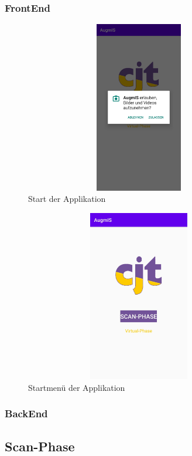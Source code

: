\subsubsection{FrontEnd}
\begin{figure}[hbt!]
    \centering
    \includegraphics[width=10cm,height=7.5cm,keepaspectratio]{4Umsetzung/Bilder/camera_permission.jpg}
    \caption{Start der Applikation}
    \label{pic:camera_perm}
\end{figure}
\begin{figure}[hbt!]
    \centering
    \includegraphics[width=10cm,height=7.5cm,keepaspectratio]{4Umsetzung/Bilder/startmenu.jpg}
    \caption{Startmenü der Applikation}
    \label{pic:startmenu}
\end{figure}
\subsubsection{BackEnd}

\subsection{Scan-Phase} %

